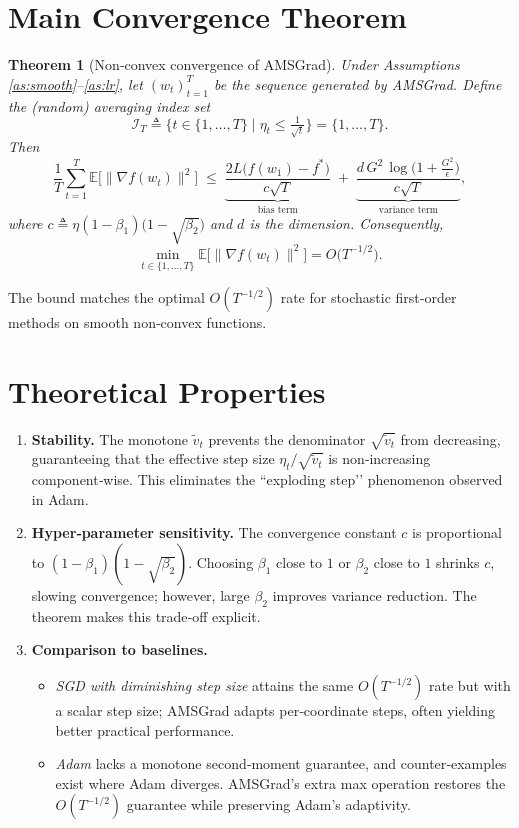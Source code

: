 \documentclass{article}
\newtheorem{theorem}{Theorem}
\newcommand{\E}{\mathbb{E}}
\begin{document}
\section*{Main Convergence Theorem}
\begin{theorem}[Non‑convex convergence of AMSGrad]\label{thm:main}
Under Assumptions \ref{as:smooth}–\ref{as:lr}, let $(w_{t})_{t=1}^{T}$ be the sequence generated by AMSGrad. Define the (random) averaging index set
\[
\mathcal{I}_{T}\triangleq\bigl\{t\in\{1,\dots,T\}\mid \eta_{t}\le \tfrac{1}{\sqrt{t}}\bigr\}= \{1,\dots,T\}.
\]
Then
\[
\frac{1}{T}\sum_{t=1}^{T}\E\!\bigl[\|\nabla f(w_{t})\|^{2}\bigr]
\;\le\;
\underbrace{\frac{2L\bigl(f(w_{1})-f^{*}\bigr)}{c\sqrt{T}}}_{\text{bias term}}
\;+\;
\underbrace{\frac{d\,G^{2}\,\log\!\bigl(1+\tfrac{G^{2}}{\epsilon}\bigr)}{c\sqrt{T}}}_{\text{variance term}},
\]
where $c\triangleq \eta(1-\beta_{1})\bigl(1-\sqrt{\beta_{2}}\bigr)$ and $d$ is the dimension. Consequently,
\[
\min_{t\in\{1,\dots,T\}}\E\!\bigl[\|\nabla f(w_{t})\|^{2}\bigr]=O\!\bigl(T^{-1/2}\bigr).
\]
\end{theorem}
The bound matches the optimal $O(T^{-1/2})$ rate for stochastic first‑order methods on smooth non‑convex functions.

\section*{Theoretical Properties}
\begin{enumerate}[label=\arabic*.]
\item \textbf{Stability.} The monotone $\tilde v_{t}$ prevents the denominator $\sqrt{\tilde v_{t}}$ from decreasing, guaranteeing that the effective step size $\eta_{t}/\sqrt{\tilde v_{t}}$ is non‑increasing component‑wise. This eliminates the ``exploding step’’ phenomenon observed in Adam.
\item \textbf{Hyper‑parameter sensitivity.} The convergence constant $c$ is proportional to $(1-\beta_{1})(1-\sqrt{\beta_{2}})$. Choosing $\beta_{1}$ close to $1$ or $\beta_{2}$ close to $1$ shrinks $c$, slowing convergence; however, large $\beta_{2}$ improves variance reduction. The theorem makes this trade‑off explicit.
\item \textbf{Comparison to baselines.}
    \begin{itemize}
        \item \emph{SGD with diminishing step size} attains the same $O(T^{-1/2})$ rate but with a scalar step size; AMSGrad adapts per‑coordinate steps, often yielding better practical performance.
        \item \emph{Adam} lacks a monotone second‑moment guarantee, and counter‑examples exist where Adam diverges. AMSGrad’s extra max operation restores the $O(T^{-1/2})$ guarantee while preserving Adam’s adaptivity.
    \end{itemize}
\end{enumerate}
\end{document}
